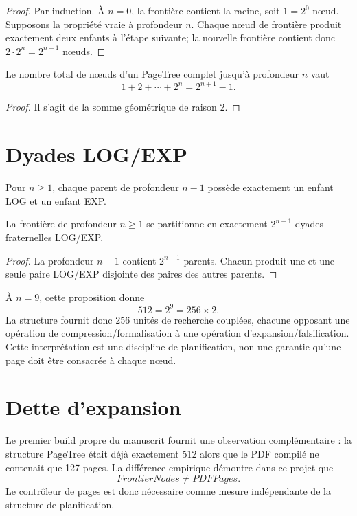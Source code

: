 \begin{proof}
Par induction. À $n=0$, la frontière contient la racine, soit $1=2^0$ nœud. Supposons la propriété vraie à profondeur $n$. Chaque nœud de frontière produit exactement deux enfants à l'étape suivante; la nouvelle frontière contient donc $2\cdot2^n=2^{n+1}$ nœuds.
\end{proof}

\begin{proposition}
Le nombre total de nœuds d'un PageTree complet jusqu'à profondeur $n$ vaut
\[
1+2+\cdots+2^n=2^{n+1}-1.
\]
\end{proposition}

\begin{proof}
Il s'agit de la somme géométrique de raison 2.
\end{proof}

\section{Dyades LOG/EXP}

Pour $n\geq1$, chaque parent de profondeur $n-1$ possède exactement un enfant LOG et un enfant EXP.

\begin{proposition}
La frontière de profondeur $n\geq1$ se partitionne en exactement $2^{n-1}$ dyades fraternelles LOG/EXP.
\end{proposition}

\begin{proof}
La profondeur $n-1$ contient $2^{n-1}$ parents. Chacun produit une et une seule paire LOG/EXP disjointe des paires des autres parents.
\end{proof}

À $n=9$, cette proposition donne
\[
512=2^9=256\times2.
\]
La structure fournit donc 256 unités de recherche couplées, chacune opposant une opération de compression/formalisation à une opération d'expansion/falsification. Cette interprétation est une discipline de planification, non une garantie qu'une page doit être consacrée à chaque nœud.

\section{Dette d'expansion}

Le premier build propre du manuscrit fournit une observation complémentaire : la structure PageTree était déjà exactement 512 alors que le PDF compilé ne contenait que 127 pages. La différence empirique démontre dans ce projet que
\[
FrontierNodes\neq PDFPages.
\]
Le contrôleur de pages est donc nécessaire comme mesure indépendante de la structure de planification.
